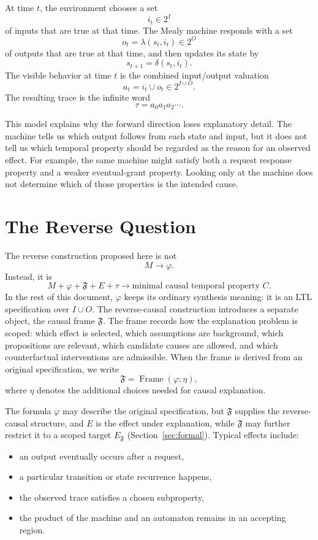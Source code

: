 \documentclass[11pt]{article}
\theoremstyle{remark}
\newcommand{\Frame}{\mathfrak{F}}
\newcommand{\Design}{\eta}
\begin{document}
At time \(t\), the environment chooses a set
\[
  i_t \in 2^I
\]
of inputs that are true at that time. The Mealy machine responds with a set
\[
  o_t = \lambda(s_t,i_t) \in 2^O
\]
of outputs that are true at that time, and then updates its state by
\[
  s_{t+1} = \delta(s_t,i_t).
\]
The visible behavior at time \(t\) is the combined input/output valuation
\[
  a_t = i_t \cup o_t \in 2^{I\cup O}.
\]
The resulting trace is the infinite word
\[
  \tau = a_0 a_1 a_2 \cdots .
\]

This model explains why the forward direction loses explanatory detail. The
machine tells us which output follows from each state and input, but it does not
tell us which temporal property should be regarded as the reason for an
observed effect. For example, the same machine might satisfy both a request
response property and a weaker eventual-grant property. Looking only at the
machine does not determine which of those properties is the intended cause.

\section{The Reverse Question}
\label{sec:reverse-question}

The reverse construction proposed here is not
\[
  M \longrightarrow \varphi .
\]
Instead, it is
\[
  M + \varphi + \Frame + E + \tau
  \longrightarrow
  \text{minimal causal temporal property } C .
\]
In the rest of this document, \(\varphi\) keeps its ordinary synthesis meaning:
it is an LTL specification over \(I\cup O\). The reverse-causal construction
introduces a separate object, the causal frame \(\Frame\). The frame records how
the explanation problem is scoped: which effect is selected, which assumptions
are background, which propositions are relevant, which candidate causes are
allowed, and which counterfactual interventions are admissible. When the frame
is derived from an original specification, we write
\[
  \Frame=\operatorname{Frame}(\varphi;\Design),
\]
where \(\Design\) denotes the additional choices needed for causal explanation.

The formula \(\varphi\) may describe the original specification, but
\(\Frame\) supplies the reverse-causal structure, and \(E\) is the effect under
explanation, while \(\Frame\) may further restrict it to a scoped target
\(E_{\Frame}\) (Section~\ref{sec:formal}). Typical effects include:
\begin{itemize}
  \item an output eventually occurs after a request,
  \item a particular transition or state recurrence happens,
  \item the observed trace satisfies a chosen subproperty,
  \item the product of the machine and an automaton remains in an accepting
        region.
\end{itemize}
\end{document}
